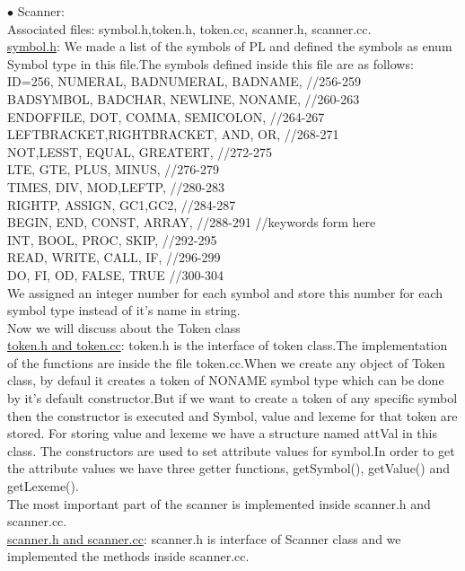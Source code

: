\documentclass[paper=letter, fontsize=12pt]{scrartcl} %
\begin{document}
$\bullet$ Scanner:\\

Associated files: symbol.h,token.h, token.cc, scanner.h, scanner.cc.\\

\underline {symbol.h}: We made a list of the symbols of PL and defined the symbols as enum Symbol type in this file.The symbols defined inside this file are as follows:\\

ID=256, NUMERAL, BADNUMERAL, BADNAME, //256-259\\ 
	BADSYMBOL, BADCHAR, NEWLINE, NONAME, //260-263\\
	ENDOFFILE, DOT, COMMA, SEMICOLON, //264-267\\
	LEFTBRACKET,RIGHTBRACKET, AND, OR, //268-271\\
	NOT,LESST, EQUAL, GREATERT, //272-275\\
	LTE, GTE, PLUS, MINUS, //276-279\\
	TIMES, DIV, MOD,LEFTP, //280-283\\
	RIGHTP, ASSIGN,	GC1,GC2, //284-287 \\
	BEGIN, END, CONST, ARRAY, //288-291  //keywords form here\\
	INT, BOOL, PROC, SKIP, //292-295\\
	READ, WRITE, CALL, IF, //296-299\\
	DO, FI, OD, FALSE, TRUE //300-304\\
We assigned an integer number for each symbol and store this number for each symbol type instead of it's name in string.\\

Now we will discuss about the Token class\\
\underline {token.h and token.cc}: token.h is the interface of token class.The implementation of the functions are inside the file token.cc.When we create any object of Token class, by defaul it creates a token of NONAME symbol type which can be done by it's default constructor.But if we want to create a token of any specific symbol then the constructor is executed and Symbol, value and lexeme for that token are stored. For storing value and lexeme we have a structure named attVal in this class. 
The constructors are used to set attribute values for symbol.In order to get the attribute values we have three getter functions, getSymbol(), getValue() and getLexeme().\\

The most important part of the scanner is implemented inside scanner.h and scanner.cc.\\
\underline {scanner.h and scanner.cc}: scanner.h is interface of Scanner class and we implemented the methods inside scanner.cc.\\
\end{document}
